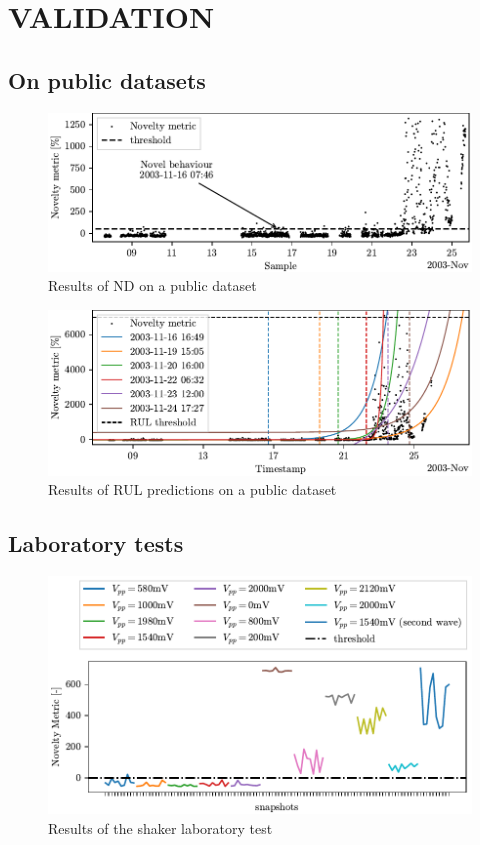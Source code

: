 \section{VALIDATION}
\label{sec:validation}

\subsection{On public datasets}
\begin{figure}
    \includegraphics[width=\linewidth]{images/ND_IMS.pdf}
    \caption{Results of ND on a public dataset}
    \label{fig:roc_curve}
\end{figure}
\begin{figure}
    \includegraphics[width=\linewidth]{images/RUL_IMS.pdf}
    \caption{Results of RUL predictions on a public dataset}
    \label{fig:roc_curve}
\end{figure}

\subsection{Laboratory tests}
\begin{figure}
    \includegraphics[width=\linewidth]{images/Test02_LOF.pdf}
    \caption{Results of the shaker laboratory test}
    \label{fig:roc_curve}
\end{figure}